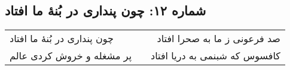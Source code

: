 \begin{center}
\section*{شماره ۱۲: چون پنداری در بُنۀ ما افتاد}
\label{sec:012}
\begin{longtable}{l p{0.5cm} r}
چون پنداری در بُنهٔ ما افتاد
&&
صد فرعونی ز ما به صحرا افتاد
\\
پر مشغله و خروش کردی عالم
&&
کافسوس که شبنمی به دریا افتاد
\\
\end{longtable}
\end{center}
